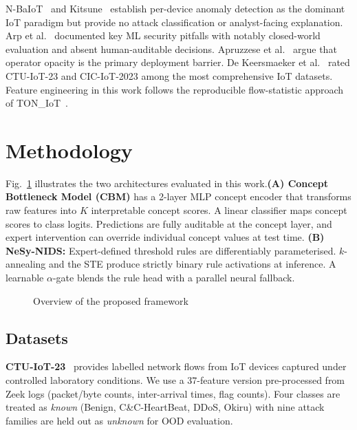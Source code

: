 \documentclass[journal]{IEEEtran}
\begin{document}
N-BaIoT~\cite{meidan2018nbaiot} and Kitsune~\cite{mirsky2018kitsune} establish per-device anomaly detection as the dominant IoT paradigm but provide no attack classification or analyst-facing explanation. Arp et al.~\cite{arp2022dos} documented key ML security pitfalls with notably closed-world evaluation and absent human-auditable decisions. Apruzzese et al.~\cite{apruzzese2022ml} argue that operator opacity is the primary deployment barrier. De Keersmaeker et al.~\cite{dekeersmaeker2023survey} rated CTU-IoT-23 and CIC-IoT-2023 among the most comprehensive IoT datasets. Feature engineering in this work follows the reproducible flow-statistic approach of TON\_IoT~\cite{alsaedi2020toniot}.


\section{Methodology}

Fig.~\ref{fig:arch} illustrates the two architectures evaluated in this
work.\textbf{(A) Concept Bottleneck Model (CBM)} has a 2-layer MLP concept encoder that transforms raw features into $K$ interpretable concept scores. A linear classifier maps concept scores to class logits.  Predictions are fully auditable at the concept layer, and expert intervention can override individual concept values at test time. \textbf{(B) NeSy-NIDS:} Expert-defined threshold rules are  differentiably parameterised. $k$-annealing and the STE produce strictly binary rule activations at inference. A learnable $\alpha$-gate blends the rule head with a parallel neural fallback.

\begin{figure}[t]
    \centering
    \vspace{-1mm}
    \def\svgwidth{.85\textwidth}
    \fontsize{5}{5}\selectfont
    
    \vspace{-1mm}
    \caption{Overview of the proposed framework}
    \label{fig:arch}
    \vspace{-2mm}
\end{figure}

\subsection{Datasets}

\textbf{CTU-IoT-23}~\cite{parmisano2020ctu} provides labelled network flows from IoT devices captured under controlled laboratory conditions. We use a 37-feature version pre-processed from Zeek logs (packet/byte counts, inter-arrival times, flag counts). Four classes are treated as \emph{known} (Benign, C\&C-HeartBeat, DDoS, Okiru) with nine attack families are held out as \emph{unknown} for OOD evaluation.
\end{document}
